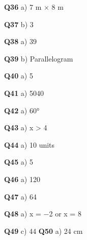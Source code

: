 \textbf{Q36} a) 7 m × 8 m\par
\textbf{Q37} b) 3\par
\textbf{Q38} a) 39\par
\textbf{Q39} b) Parallelogram\par
\textbf{Q40} a) 5\par
\textbf{Q41} a) 5040\par
\textbf{Q42} a) 60°\par
\textbf{Q43} a) x > 4\par
\textbf{Q44} a) 10 units\par
\textbf{Q45} a) 5\par
\textbf{Q46} a) 120\par
\textbf{Q47} a) 64\par
\textbf{Q48} a) x = −2 or x = 8\par
\textbf{Q49} c) 44%
\textbf{Q50} a) 24 cm\par